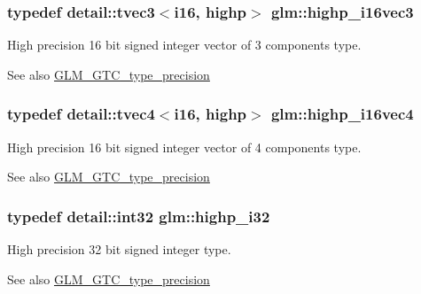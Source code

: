 \subsubsection[{\texorpdfstring{highp\+\_\+i16vec3}{highp_i16vec3}}]{\setlength{\rightskip}{0pt plus 5cm}typedef detail\+::tvec3$<$i16, highp$>$ {\bf glm\+::highp\+\_\+i16vec3}}\hypertarget{group__gtc__type__precision_ga8dcfd412bd9ce99a1cf5c2b6e50f07e7}{}\label{group__gtc__type__precision_ga8dcfd412bd9ce99a1cf5c2b6e50f07e7}
High precision 16 bit signed integer vector of 3 components type. \begin{DoxySeeAlso}{See also}
\hyperlink{group__gtc__type__precision}{G\+L\+M\+\_\+\+G\+T\+C\+\_\+type\+\_\+precision} 
\end{DoxySeeAlso}
\subsubsection[{\texorpdfstring{highp\+\_\+i16vec4}{highp_i16vec4}}]{\setlength{\rightskip}{0pt plus 5cm}typedef detail\+::tvec4$<$i16, highp$>$ {\bf glm\+::highp\+\_\+i16vec4}}\hypertarget{group__gtc__type__precision_ga7fd6f1b3c224833cc330a2c64b6994dd}{}\label{group__gtc__type__precision_ga7fd6f1b3c224833cc330a2c64b6994dd}
High precision 16 bit signed integer vector of 4 components type. \begin{DoxySeeAlso}{See also}
\hyperlink{group__gtc__type__precision}{G\+L\+M\+\_\+\+G\+T\+C\+\_\+type\+\_\+precision} 
\end{DoxySeeAlso}
\subsubsection[{\texorpdfstring{highp\+\_\+i32}{highp_i32}}]{\setlength{\rightskip}{0pt plus 5cm}typedef detail\+::int32 {\bf glm\+::highp\+\_\+i32}}\hypertarget{group__gtc__type__precision_ga197d19b585222da57d70238a5cfc2be8}{}\label{group__gtc__type__precision_ga197d19b585222da57d70238a5cfc2be8}
High precision 32 bit signed integer type. \begin{DoxySeeAlso}{See also}
\hyperlink{group__gtc__type__precision}{G\+L\+M\+\_\+\+G\+T\+C\+\_\+type\+\_\+precision} 
\end{DoxySeeAlso}
